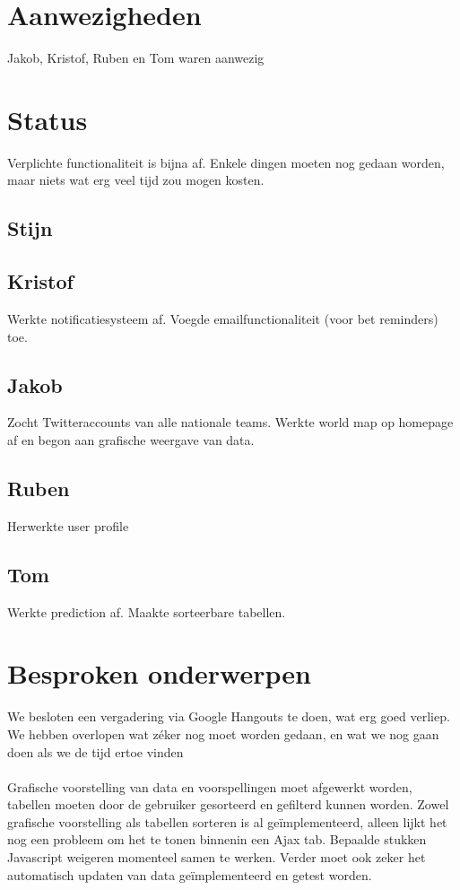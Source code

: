 \documentclass[11pt, a4paper]{article}
\begin{document}
\title{}
\author{Groep A}
\date{21 mei 2014}
\maketitle

\section{Aanwezigheden}
Jakob, Kristof, Ruben en Tom waren aanwezig
\section{Status}
Verplichte functionaliteit is bijna af. Enkele dingen moeten nog gedaan worden, maar niets wat erg veel tijd zou mogen kosten.
\subsection{Stijn}

\subsection{Kristof}
Werkte notificatiesysteem af. Voegde emailfunctionaliteit (voor bet reminders) toe.
\subsection{Jakob}
Zocht Twitteraccounts van alle nationale teams. Werkte world map op homepage af en begon aan grafische weergave van data.
\subsection{Ruben}
Herwerkte user profile
\subsection{Tom}
Werkte prediction af. Maakte sorteerbare tabellen.

\section{Besproken onderwerpen}
We besloten een vergadering via Google Hangouts te doen, wat erg goed verliep. We hebben overlopen wat z\'eker nog moet worden gedaan, en wat we nog gaan doen als we de tijd ertoe vinden\\
\\
Grafische voorstelling van data en voorspellingen moet afgewerkt worden, tabellen moeten door de gebruiker gesorteerd en gefilterd kunnen worden. Zowel grafische voorstelling als tabellen sorteren is al ge\"implementeerd, alleen lijkt het nog een probleem om het te tonen binnenin een Ajax tab. Bepaalde stukken Javascript weigeren momenteel samen te werken. Verder moet ook zeker het automatisch updaten van data ge\"implementeerd en getest worden.
\\
\\
\end{document}
